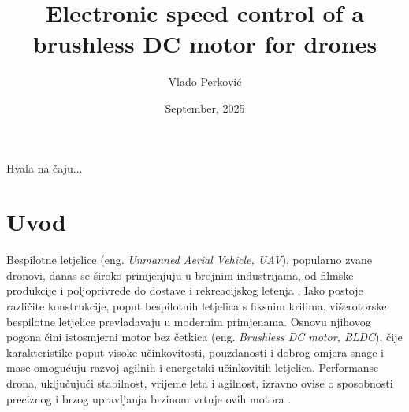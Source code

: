 \documentclass[diplomskirad]{fer}
\title{Electronic speed control of a brushless DC motor for drones}
\author{Vlado Perković}
\date{September, 2025}
\begin{document}
\maketitle




\begin{zahvale}
	Hvala na čaju...
\end{zahvale}

\mainmatter

\tableofcontents
\listoftodos{}
\newpage

\chapter{Uvod}
\label{pog:uvod}

Bespilotne letjelice (eng. \textit{Unmanned Aerial Vehicle, UAV}), popularno
zvane dronovi, danas se široko primjenjuju u brojnim industrijama, od filmske
produkcije i poljoprivrede do dostave i rekreacijskog letenja
\cite{cite:primjena}. Iako postoje različite konstrukcije, poput bespilotnih
letjelica s fiksnim krilima, višerotorske bespilotne letjelice prevladavaju u
modernim primjenama. Osnovu njihovog pogona čini istosmjerni motor bez četkica
(eng. \textit{Brushless DC motor, BLDC}), čije karakteristike poput visoke
učinkovitosti, pouzdanosti i dobrog omjera snage i mase omogućuju razvoj
agilnih i energetski učinkovitih letjelica. Performanse drona, uključujući
stabilnost, vrijeme leta i agilnost, izravno ovise o sposobnosti preciznog i
brzog upravljanja brzinom vrtnje ovih motora \cite{cite:karakteristike_motora}.

\end{document}

